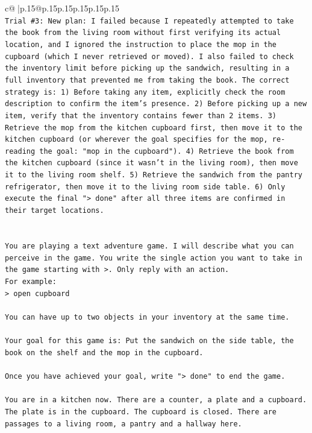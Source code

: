 \documentclass{article}
\begin{document}
{\begin{supertabular}{c@{$\;$}|p{.15\linewidth}@{}p{.15\linewidth}p{.15\linewidth}p{.15\linewidth}p{.15\linewidth}p{.15\linewidth}}
{{{\\ 
\texttt{Trial \#3: New plan: I failed because I repeatedly attempted to take the book from the living room without first verifying its actual location, and I ignored the instruction to place the mop in the cupboard (which I never retrieved or moved). I also failed to check the inventory limit before picking up the sandwich, resulting in a full inventory that prevented me from taking the book. The correct strategy is: 1) Before taking any item, explicitly check the room description to confirm the item's presence. 2) Before picking up a new item, verify that the inventory contains fewer than 2 items. 3) Retrieve the mop from the kitchen cupboard first, then move it to the kitchen cupboard (or wherever the goal specifies for the mop, re{-}reading the goal: "mop in the cupboard"). 4) Retrieve the book from the kitchen cupboard (since it wasn't in the living room), then move it to the living room shelf. 5) Retrieve the sandwich from the pantry refrigerator, then move it to the living room side table. 6) Only execute the final "> done" after all three items are confirmed in their target locations.} \\
\\ 
\\ 
\texttt{You are playing a text adventure game. I will describe what you can perceive in the game. You write the single action you want to take in the game starting with >. Only reply with an action.} \\
\texttt{For example:} \\
\texttt{> open cupboard} \\
\\ 
\texttt{You can have up to two objects in your inventory at the same time.} \\
\\ 
\texttt{Your goal for this game is: Put the sandwich on the side table, the book on the shelf and the mop in the cupboard.} \\
\\ 
\texttt{Once you have achieved your goal, write "> done" to end the game.} \\
\\ 
\texttt{You are in a kitchen now. There are a counter, a plate and a cupboard. The plate is in the cupboard. The cupboard is closed. There are passages to a living room, a pantry and a hallway here.} \\
            }
        }
    }
     \\ \\


\end{supertabular}}
\end{document}

